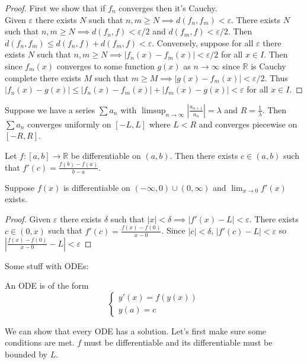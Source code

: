 \documentclass{article}
\newcommand{\R}{\mathbb{R}}
\newcommand{\eps}{\varepsilon}
\newcommand{\ra}[1][]{\xrightarrow{#1}}
\begin{document}
\begin{proof}
  First we show that if $f_n$ converges then it's Cauchy.\\
  Given $\eps$ there exists $N$ such that $n,m\geq N\implies d(f_n,f_m)<\eps$. There exists $N$ such that $n,m\geq N\implies d(f_n,f)<\eps/2$ and $d(f_m,f)<\eps/2$. Then $d(f_n,f_m)\leq d(f_n,f)+d(f_m,f)<\eps$. Conversely, suppose for all $\eps$ there exists $N$ such that $n,m\geq N\implies |f_n(x)-f_m(x)|<\eps/2$ for all $x\in I$.
  Then since $f_m(x)$ converges to some function $g(x)$ as $n\ra\infty$ since $\R$ is Cauchy complete there exists $M$ such that $m\geq M\implies |g(x)-f_m(x)|<\eps/2$. Thus $|f_n(x)-g(x)|\leq|f_n(x)-f_m(x)|+|f_m(x)-g(x)|<\eps$ for all $x\in I$.
\end{proof}
\begin{theorem}
  Suppose we have a series $\sum a_n$ with $\limsup_{n\to\infty}|\frac{a_{n+1}}{a_n}|=\lambda$ and $R=\frac{1}{\lambda}$. Then $\sum a_n$ converges uniformly on $[-L,L]$ where $L<R$ and converges piecewise on $[-R,R]$.
\end{theorem}
\begin{theorem}
  Let $f:[a,b]\ra \R$ be differentiable on $(a,b)$. Then there exists $c\in(a,b)$ such that $f'(c)=\frac{f(b)-f(a)}{b-a}$.
\end{theorem}
\begin{problem}
  Suppose $f(x)$ is differentiable on $(-\infty,0)\cup(0,\infty)$ and $\lim_{x\to 0}f'(x)$ exists.
\end{problem}
\begin{proof}
  Given $\eps$ there exists $\delta$ such that $|x|<\delta\implies |f'(x)-L|<\eps$. There exists $c\in(0,x)$ such that $f'(c)=\frac{f(x)-f(0)}{x-0}$. Since $|c|<\delta$, $|f'(c)-L|<\eps$ so $|\frac{f(x)-f(0)}{x-0}-L|<\eps$
\end{proof}
Some stuff with ODEs:
\begin{definition}
  An ODE is of the form
  \begin{equation*}
    \begin{cases}
      y'(x)=f(y(x)) \\
      y(a)=c
    \end{cases}
  \end{equation*}
\end{definition}
We can show that every ODE has a solution. Let's first make sure some conditions are met. $f$ must be differentiable and its differentiable must be bounded by $L$.
\end{document}
